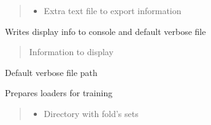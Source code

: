 \documentclass[letterpaper,10pt,english]{sphinxmanual}
\begin{document}
\begin{fulllineitems}
\begin{fulllineitems}
\begin{quote}
\begin{description}
\begin{itemize}
\item {} 
\sphinxAtStartPar
{} \textendash{} Extra text file to export information

\end{itemize}

\end{description}\end{quote}

\end{fulllineitems}


\begin{fulllineitems}
\label{\detokenize{net:net.UVANEMO.__out_to_verbose}}
\pysigstartsignatures
{}
\pysigstopsignatures
\sphinxAtStartPar
Writes display info to console and default verbose file
\begin{quote}\begin{description}
\sphinxAtStartPar
{} \textendash{} Information to display

\end{description}\end{quote}

\end{fulllineitems}


\begin{fulllineitems}
\label{\detokenize{net:net.UVANEMO.__out_verbose}}
\pysigstartsignatures
{}
\pysigstopsignatures
\sphinxAtStartPar
Default verbose file path

\end{fulllineitems}


\begin{fulllineitems}
\label{\detokenize{net:net.UVANEMO.__prepare_loaders}}
\pysigstartsignatures
{}
\pysigstopsignatures
\sphinxAtStartPar
Prepares loaders for training
\begin{quote}\begin{description}
\begin{itemize}
\item {} 
\sphinxAtStartPar
{} \textendash{} Directory with fold’s sets


\end{itemize}
\end{description}
\end{quote}
\end{fulllineitems}
\end{fulllineitems}
\end{document}
